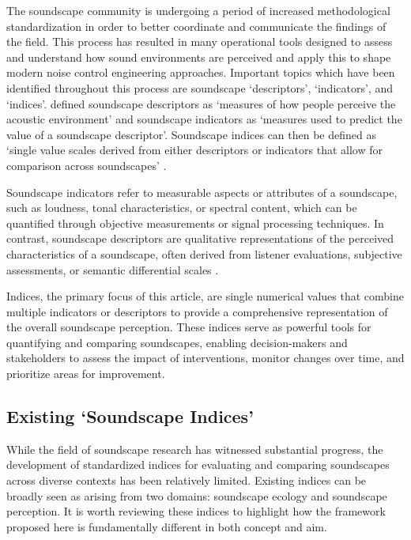 \documentclass[
  authoryear,
  preprint,
  3p]{elsarticle}
\begin{document}
The soundscape community is undergoing a period of increased
methodological standardization in order to better coordinate and
communicate the findings of the field. This process has resulted in many
operational tools designed to assess and understand how sound
environments are perceived and apply this to shape modern noise control
engineering approaches. Important topics which have been identified
throughout this process are soundscape `descriptors', `indicators', and
`indices'. \citet{Aletta2016Soundscape} defined soundscape descriptors
as `measures of how people perceive the acoustic environment' and
soundscape indicators as `measures used to predict the value of a
soundscape descriptor'. Soundscape indices can then be defined as
`single value scales derived from either descriptors or indicators that
allow for comparison across soundscapes' \citep{Kang2019Towards}.

Soundscape indicators refer to measurable aspects or attributes of a
soundscape, such as loudness, tonal characteristics, or spectral
content, which can be quantified through objective measurements or
signal processing techniques. In contrast, soundscape descriptors are
qualitative representations of the perceived characteristics of a
soundscape, often derived from listener evaluations, subjective
assessments, or semantic differential scales \citep{ISO12913Part2}.

Indices, the primary focus of this article, are single numerical values
that combine multiple indicators or descriptors to provide a
comprehensive representation of the overall soundscape perception. These
indices serve as powerful tools for quantifying and comparing
soundscapes, enabling decision-makers and stakeholders to assess the
impact of interventions, monitor changes over time, and prioritize areas
for improvement.

\citep{Grinfeder2022What}

\subsection{Existing `Soundscape
Indices'}\label{existing-soundscape-indices}

While the field of soundscape research has witnessed substantial
progress, the development of standardized indices for evaluating and
comparing soundscapes across diverse contexts has been relatively
limited. Existing indices can be broadly seen as arising from two
domains: soundscape ecology and soundscape perception. It is worth
reviewing these indices to highlight how the framework proposed here is
fundamentally different in both concept and aim.
\end{document}
